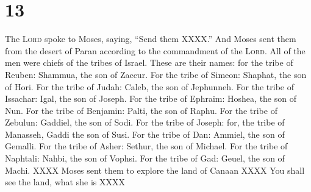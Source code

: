 \section{13}
\begin{enumerate}[align=center]
     The \textsc{Lord} spoke to Moses, saying,%
     ``Send them XXXX.''%
     And Moses sent them from the desert of Paran according to the commandment of the \textsc{Lord}. All of the men were chiefs of the tribes of Israel.%
     These are their names: for the tribe of Reuben: Shammua, the son of Zaccur.%
     For the tribe of Simeon: Shaphat, the son of Hori.%
     For the tribe of Judah: Caleb, the son of Jephunneh.%
     For the tribe of Issachar: Igal, the son of Joseph.%
     For the tribe of Ephraim: Hoshea, the son of Nun.%
     For the tribe of Benjamin: Palti, the son of Raphu.%
     For the tribe of Zebulun: Gaddiel, the son of Sodi.%
     For the tribe of Joseph: for, the tribe of Manasseh, Gaddi the son of Susi.%
     For the tribe of Dan: Ammiel, the son of Gemalli.%
     For the tribe of Asher: Sethur, the son of Michael.%
     For the tribe of Naphtali: Nahbi, the son of Vophsi.%
     For the tribe of Gad: Geuel, the son of Machi.%
     XXXX%
     Moses sent them to explore the land of Canaan XXXX%
     You shall see the land, what she is XXXX%
\end{enumerate}
